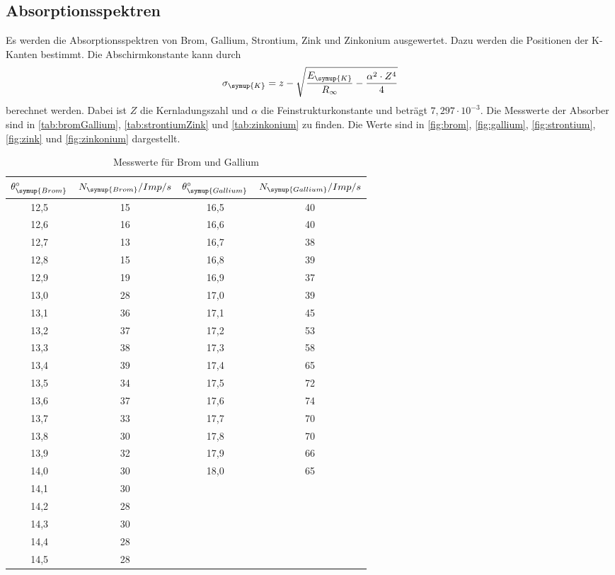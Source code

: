 \subsection{Absorptionsspektren}
\label{sec:Absorptionsspektren}
Es werden die Absorptionsspektren von Brom, Gallium, Strontium, Zink und Zinkonium ausgewertet. Dazu werden die
Positionen der K-Kanten bestimmt. Die Abschirmkonstante kann durch
\begin{align*}
  \sigma_{\symup{K}} = z - \sqrt{\frac{E_{\symup{K}}}{R_{\infty}}-\frac{\alpha^2 \cdot Z^4}{4}}
\end{align*}
berechnet werden. Dabei ist $Z$ die Kernladungszahl und $\alpha$ die Feinstrukturkonstante und beträgt $7,297\cdot
10^{-3}$.
Die Messwerte der Absorber sind in \autoref{tab:bromGallium}, \autoref{tab:strontiumZink} und \autoref{tab:zinkonium} zu finden.
Die Werte sind in \autoref{fig:brom}, \autoref{fig:gallium}, \autoref{fig:strontium}, \autoref{fig:zink} und
\autoref{fig:zinkonium} dargestellt.
\begin{table}
  \centering
  \caption{Messwerte für Brom und Gallium}
  \label{tab:bromGallium}
  \begin{tabular}{c c | c c}
    \toprule
    $\theta_{\symup{Brom}}^{\circ}$ & $N_{\symup{Brom}}/Imp/s$ & $\theta_{\symup{Gallium}}^{\circ}$ & $N_{\symup{Gallium}}/Imp/s$ \\
    \midrule
    12,5 & 15 & 16,5  & 40 \\
    12,6 & 16 & 16,6  & 40 \\
    12,7 & 13 & 16,7  & 38 \\
    12,8 & 15 & 16,8  & 39 \\
    12,9 & 19 & 16,9  & 37 \\
    13,0 & 28 & 17,0  & 39 \\
    13,1 & 36 & 17,1  & 45 \\
    13,2 & 37 & 17,2  & 53 \\
    13,3 & 38 & 17,3  & 58 \\
    13,4 & 39 & 17,4  & 65 \\
    13,5 & 34 & 17,5  & 72 \\
    13,6 & 37 & 17,6  & 74 \\
    13,7 & 33 & 17,7  & 70 \\
    13,8 & 30 & 17,8  & 70 \\
    13,9 & 32 & 17,9  & 66 \\
    14,0 & 30 & 18,0  & 65 \\
    14,1 & 30 &       &    \\
    14,2 & 28 &       &    \\
    14,3 & 30 &       &    \\
    14,4 & 28 &       &    \\
    14,5 & 28 &       &    \\
    \bottomrule
  \end{tabular}
\end{table}

